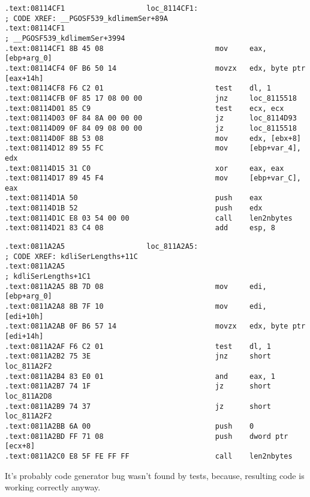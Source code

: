 \documentclass[11pt,a4paper,oneside]{book}
\begin{document}
\begin{lstlisting}[caption=\IFRU{kdli.o из}{kdli.o from} libserver11.a]
.text:08114CF1                   loc_8114CF1:                            ; CODE XREF: __PGOSF539_kdlimemSer+89A
.text:08114CF1                                                           ; __PGOSF539_kdlimemSer+3994
.text:08114CF1 8B 45 08                          mov     eax, [ebp+arg_0]
.text:08114CF4 0F B6 50 14                       movzx   edx, byte ptr [eax+14h]
.text:08114CF8 F6 C2 01                          test    dl, 1
.text:08114CFB 0F 85 17 08 00 00                 jnz     loc_8115518
.text:08114D01 85 C9                             test    ecx, ecx
.text:08114D03 0F 84 8A 00 00 00                 jz      loc_8114D93
.text:08114D09 0F 84 09 08 00 00                 jz      loc_8115518
.text:08114D0F 8B 53 08                          mov     edx, [ebx+8]
.text:08114D12 89 55 FC                          mov     [ebp+var_4], edx
.text:08114D15 31 C0                             xor     eax, eax
.text:08114D17 89 45 F4                          mov     [ebp+var_C], eax
.text:08114D1A 50                                push    eax
.text:08114D1B 52                                push    edx
.text:08114D1C E8 03 54 00 00                    call    len2nbytes
.text:08114D21 83 C4 08                          add     esp, 8
\end{lstlisting}

\begin{lstlisting}[caption=\IFRU{оттуда же}{from the same code}]
.text:0811A2A5                   loc_811A2A5:                            ; CODE XREF: kdliSerLengths+11C
.text:0811A2A5                                                           ; kdliSerLengths+1C1
.text:0811A2A5 8B 7D 08                          mov     edi, [ebp+arg_0]
.text:0811A2A8 8B 7F 10                          mov     edi, [edi+10h]
.text:0811A2AB 0F B6 57 14                       movzx   edx, byte ptr [edi+14h]
.text:0811A2AF F6 C2 01                          test    dl, 1
.text:0811A2B2 75 3E                             jnz     short loc_811A2F2
.text:0811A2B4 83 E0 01                          and     eax, 1
.text:0811A2B7 74 1F                             jz      short loc_811A2D8
.text:0811A2B9 74 37                             jz      short loc_811A2F2
.text:0811A2BB 6A 00                             push    0
.text:0811A2BD FF 71 08                          push    dword ptr [ecx+8]
.text:0811A2C0 E8 5F FE FF FF                    call    len2nbytes
\end{lstlisting}

{It's probably code generator bug wasn't found by tests, because, 
resulting code is working correctly anyway.}





\printindex



\end{document}
